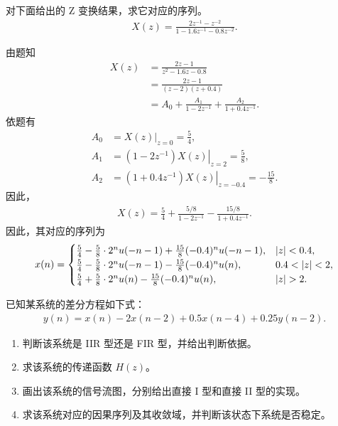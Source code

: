 \begin{example}
    对下面给出的 Z 变换结果，求它对应的序列。
    \begin{align*}
        X(z) = \frac{2z^{-1} - z^{-2}}{1 - 1.6z^{-1} - 0.8z^{-2}}.
    \end{align*}
\end{example}

\begin{solution}
    由题知
    \begin{align*}
        X(z) & = \frac{2z - 1}{z^2 - 1.6z - 0.8} \\
        & = \frac{2z - 1}{(z - 2)(z + 0.4)} \\
        & = A_0 + \frac{A_1}{1 - 2z^{-1}} + \frac{A_2}{1 + 0.4z^{-1}}.
    \end{align*}
    依题有
    \begin{align*}
        A_0 & = \left.X(z)\right|_{z = 0} = \frac{5}{4}, \\
        A_1 & = \left.(1 - 2z^{-1})X(z)\right|_{z = 2} = \frac{5}{8}, \\
        A_2 & = \left.(1 + 0.4z^{-1})X(z)\right|_{z = -0.4} = -\frac{15}{8}.
    \end{align*}
    因此，
    \begin{align*}
        X(z) = \frac{5}{4} + \frac{5/8}{1 - 2z^{-1}} - \frac{15/8}{1 + 0.4z^{-1}}.
    \end{align*}
    因此，其对应的序列为
    \begin{align*}
        x(n) = \begin{cases}
            \frac{5}{4} - \frac{5}{8}\cdot2^n u(-n - 1) + \frac{15}{8}(-0.4)^n u(-n - 1), & \left|z\right| < 0.4, \\
            \frac{5}{4} - \frac{5}{8}\cdot2^n u(-n - 1) - \frac{15}{8}(-0.4)^n u(n), & 0.4 < \left|z\right| < 2, \\
            \frac{5}{4} + \frac{5}{8}\cdot2^n u(n) - \frac{15}{8}(-0.4)^n u(n), & \left|z\right| > 2.
        \end{cases}
    \end{align*}
\end{solution}

\begin{exercise}
    已知某系统的差分方程如下式：
    \begin{align*}
        y(n) = x(n) - 2x(n - 2) + 0.5x(n - 4) + 0.25y(n - 2).
    \end{align*}
    \begin{enumerate}[label=(\arabic*)]
        \item 判断该系统是 IIR 型还是 FIR 型，并给出判断依据。
        \item 求该系统的传递函数 $H(z)$。
        \item 画出该系统的信号流图，分别给出直接 I 型和直接 II 型的实现。
        \item 求该系统对应的因果序列及其收敛域，并判断该状态下系统是否稳定。
    \end{enumerate}
\end{exercise}

